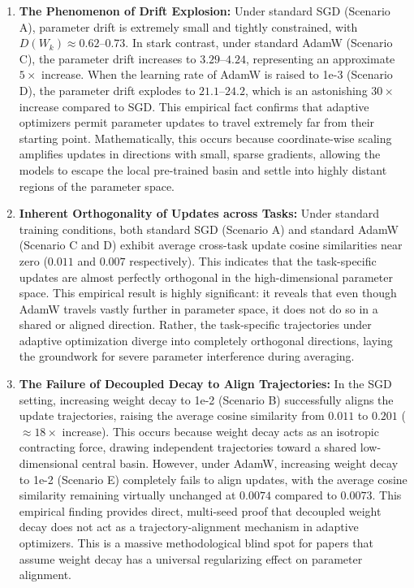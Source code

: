 \documentclass{article}
\theoremstyle{plain}
\theoremstyle{definition}
\theoremstyle{remark}
\begin{document}
\begin{enumerate}
    \item \textbf{The Phenomenon of Drift Explosion:} Under standard SGD (Scenario A), parameter drift is extremely small and tightly constrained, with $D(W_k) \approx 0.62$--$0.73$. In stark contrast, under standard AdamW (Scenario C), the parameter drift increases to $3.29$--$4.24$, representing an approximate $5\times$ increase. When the learning rate of AdamW is raised to 1e-3 (Scenario D), the parameter drift explodes to $21.1$--$24.2$, which is an astonishing $30\times$ increase compared to SGD. This empirical fact confirms that adaptive optimizers permit parameter updates to travel extremely far from their starting point. Mathematically, this occurs because coordinate-wise scaling amplifies updates in directions with small, sparse gradients, allowing the models to escape the local pre-trained basin and settle into highly distant regions of the parameter space.
    \item \textbf{Inherent Orthogonality of Updates across Tasks:} Under standard training conditions, both standard SGD (Scenario A) and standard AdamW (Scenario C and D) exhibit average cross-task update cosine similarities near zero ($0.011$ and $0.007$ respectively). This indicates that the task-specific updates are almost perfectly orthogonal in the high-dimensional parameter space. This empirical result is highly significant: it reveals that even though AdamW travels vastly further in parameter space, it does not do so in a shared or aligned direction. Rather, the task-specific trajectories under adaptive optimization diverge into completely orthogonal directions, laying the groundwork for severe parameter interference during averaging.
    \item \textbf{The Failure of Decoupled Decay to Align Trajectories:} In the SGD setting, increasing weight decay to 1e-2 (Scenario B) successfully aligns the update trajectories, raising the average cosine similarity from $0.011$ to $0.201$ ($\approx 18\times$ increase). This occurs because weight decay acts as an isotropic contracting force, drawing independent trajectories toward a shared low-dimensional central basin. However, under AdamW, increasing weight decay to 1e-2 (Scenario E) completely fails to align updates, with the average cosine similarity remaining virtually unchanged at $0.0074$ compared to $0.0073$. This empirical finding provides direct, multi-seed proof that decoupled weight decay does not act as a trajectory-alignment mechanism in adaptive optimizers. This is a massive methodological blind spot for papers that assume weight decay has a universal regularizing effect on parameter alignment.
\end{enumerate}
\end{document}
